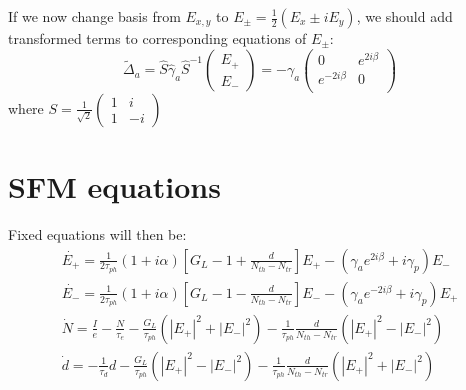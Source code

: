 \documentclass[12pt, notitlepage]{report}
\begin{document}
If we now change basis from $E_{x,y}$ to $E_\pm = \frac{1}{2}\left(E_x \pm iE_y\right)$, we should add transformed terms to corresponding equations of $E_\pm$:
\begin{equation}
	\tilde{\Delta}_a = 	\hat{S}\hat{\gamma}_a\hat{S}^{-1}\begin{pmatrix}
		E_+ \\
		E_-
	\end{pmatrix} = -\gamma_a \begin{pmatrix}
0 & e^{2 i \beta }\\
e^{-2 i \beta } & 0 \\
 \end{pmatrix}
\end{equation}
where $S = \frac{1}{\sqrt{2}}\left(\begin{smallmatrix}1 & i \\ 1 & -i\end{smallmatrix}\right)$


\section{SFM equations}
Fixed equations will then be:
\begin{gather}
	\dot{E_+} = \frac{1}{2\tau_{ph}}(1+i\alpha)\left[G_L - 1+ \frac{d}{N_{th} - N_{tr}}\right] E_+ - (\gamma_a e^{2i\beta} + i\gamma_p) E_- \\
	\dot{E_-} = \frac{1}{2\tau_{ph}}(1+i\alpha)\left[G_L - 1- \frac{d}{N_{th} - N_{tr}}\right] E_- - (\gamma_a e^{-2i\beta}  + i\gamma_p) E_+ \\
	\dot{N} = \frac{I}{e} - \frac{N}{\tau_e} - \frac{G_L}{\tau_{ph}}(|E_+|^2+|E_-|^2) - \frac{1}{\tau_{ph}}\frac{d}{N_{th} - N_{tr}}(|E_+|^2 - |E_-|^2)\\
	\dot{d} = -\frac{1}{\tau_d} d -  \frac{G_L}{\tau_{ph}}(|E_+|^2-|E_-|^2) - \frac{1}{\tau_{ph}}\frac{d}{N_{th} - N_{tr}}(|E_+|^2+|E_-|^2)
\end{gather}
\end{document}
